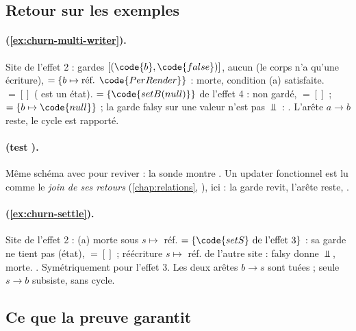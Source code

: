 \subsection{Retour sur les exemples}

\paragraph{ (\cref{ex:churn-multi-writer}).} Site
 de l'effet 2 : gardes $[(\code{b}, \code{false})]$, aucun 
(le corps n'a qu'une écriture),  $= \{b \mapsto \text{réf. } \code{PerRender}\}$ :
morte, condition (a) satisfaite.  $= []$ ( est un état).
 $= \{\code{setB(null)}\}$ de l'effet 4 : non gardé,  $= []$ ;
 $= \{b \mapsto \code{null}\}$ ; la garde \og {} falsy\fg{} sur une
valeur  n'est pas $\Bot$ : . L'arête $a \to b$ reste, le cycle est
rapporté.

\paragraph{ (test ).}
Même schéma avec  pour reviver : la sonde montre
. Un updater fonctionnel est lu comme le
\emph{join de ses retours} (\cref{chap:relations}, ), ici
 : la garde  revit, l'arête  reste, \Warning.

\paragraph{ (\cref{ex:churn-settle}).} Site  de
l'effet 2 : (a) morte sous $s \mapsto$ réf.  $= \{\code{setS} \text{ de
l'effet 3}\}$ : sa garde  ne tient pas (état),  $= []$ ; réécriture
$s \mapsto$ réf.  de l'autre site : \og {} falsy\fg{} donne $\Bot$,
morte. . Symétriquement pour l'effet 3. Les deux arêtes $b \to s$ sont tuées ;
seule $s \to b$ subsiste, sans cycle.

\subsection{Ce que la preuve garantit}

